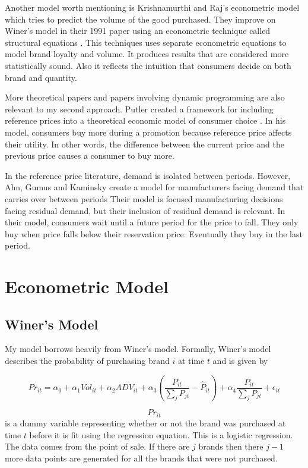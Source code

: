 \documentclass{article}
\begin{document}
Another model worth mentioning is Krishnamurthi and Raj's econometric model which tries to predict the volume of the good purchased. They improve on Winer's model in their 1991 paper using an econometric technique called structural equations \cite{krishnamurthi}. This techniques uses separate econometric equations to model brand loyalty and volume. It produces results that are considered more statistically sound. Also it reflects the intuition that consumers decide on both brand and quantity.

More theoretical papers and papers involving dynamic programming are also relevant to my second approach. Putler created a framework for including reference prices into a theoretical economic model of consumer choice \cite{putler}. In his model, consumers buy more during a promotion because reference price affects their utility. In other words, the difference between the current price and the previous price causes a consumer to buy more.

In the reference price literature, demand is isolated between periods. However, Ahn, Gumus and Kaminsky create a model for manufacturers facing demand that carries over between periods \cite{ahn} Their model is focused manufacturing decisions facing residual demand, but their inclusion of residual demand is relevant. In their model, consumers wait until a future period for the price to fall. They only buy when price falls below their reservation price. Eventually they buy in the last period.

\section{Econometric Model}

\subsection{Winer's Model}
My model borrows heavily from Winer's model. Formally, Winer's model describes the probability of purchasing brand $i$ at time $t$ and is given by

$$ {Pr}_{it} = \alpha_0 + \alpha_1 Vol_{it} + \alpha_2 ADV_{it} +  \alpha_3 (\dfrac{P_{it}} {\sum_j P_{jt}} - \hat{P}_{it})+ \alpha_4 \dfrac {P_{it}}{\sum_j P_{jt}} + \epsilon_{it}$$

$${Pr}_{it}$$ is a dummy variable representing whether or not the brand was purchased at time $t$ before it is fit using the regression equation. This is a logistic regression. The data comes from the point of sale. If there are $j$ brands then there $j-1$ more data points are generated for all the brands that were not purchased.
\end{document}
